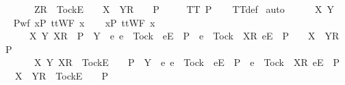 \ \ \ \ \ \ \ \ {\isacharbrackleft}Z{\isacharbrackright}\isactrlsub R\ {\isacharhash}\ {\isacharbrackleft}Tock{\isacharbrackright}\isactrlsub E\ {\isacharhash}\ {\isasymrho}\ {\isacharat}\ {\isacharbrackleft}{\isacharbrackleft}X\ {\isasymunion}\ Y{\isacharbrackright}\isactrlsub R{\isacharbrackright}\ {\isacharat}\ {\isasymsigma}\ {\isasymin}\ P{\isacharparenright}{\isacharparenright}\ {\isasymLongrightarrow}\isanewline
\ \ \ \ TT{}\ P{\isachardoublequoteclose}\isanewline
%
\isadelimproof
\ \ %
\endisadelimproof
%
\isatagproof
{}\isamarkupfalse%
\ TT{}{\isacharunderscore}def\isanewline
{}\isamarkupfalse%
\ auto\isanewline
\ \ \isamarkupfalse%
\ {\isasymrho}\ {\isasymsigma}\ X\ Y\isanewline
\ \ \isamarkupfalse%
\ P{\isacharunderscore}wf{\isacharcolon}\ {\isachardoublequoteopen}{\isasymforall}x{\isasymin}P{\isachardot}\ ttWF\ x{\isachardoublequoteclose}\isanewline
\ \ \isamarkupfalse%
\ {\isachardoublequoteopen}{\isasymforall}x{\isasymin}P{\isachardot}\ ttWF\ x\ {\isasymLongrightarrow}\isanewline
\ \ \ \ \ \ \ {\isacharparenleft}{\isasymAnd}X\ Y{\isachardot}\ {\isacharbrackleft}{\isacharbrackleft}X{\isacharbrackright}\isactrlsub R{\isacharbrackright}\ {\isasymin}\ P\ {\isasymand}\ Y\ {\isasyminter}\ {\isacharbraceleft}e{\isachardot}\ e\ {\isasymnoteq}\ Tock\ {\isasymand}\ {\isacharbrackleft}{\isacharbrackleft}e{\isacharbrackright}\isactrlsub E{\isacharbrackright}\ {\isasymin}\ P\ {\isasymor}\ e\ {\isacharequal}\ Tock\ {\isasymand}\ {\isacharbrackleft}{\isacharbrackleft}X{\isacharbrackright}\isactrlsub R{\isacharcomma}\ {\isacharbrackleft}e{\isacharbrackright}\isactrlsub E{\isacharbrackright}\ {\isasymin}\ P{\isacharbraceright}\ {\isacharequal}\ {\isacharbraceleft}{\isacharbraceright}\ {\isasymLongrightarrow}\ {\isacharbrackleft}{\isacharbrackleft}X\ {\isasymunion}\ Y{\isacharbrackright}\isactrlsub R{\isacharbrackright}\ {\isasymin}\ P{\isacharparenright}\ {\isasymLongrightarrow}\isanewline
\ \ \ \ \ \ \ {\isacharparenleft}{\isasymAnd}{\isasymsigma}\ X\ Y{\isachardot}\ {\isacharbrackleft}X{\isacharbrackright}\isactrlsub R\ {\isacharhash}\ {\isacharbrackleft}Tock{\isacharbrackright}\isactrlsub E\ {\isacharhash}\ {\isasymsigma}\ {\isasymin}\ P\ {\isasymand}\ Y\ {\isasyminter}\ {\isacharbraceleft}e{\isachardot}\ e\ {\isasymnoteq}\ Tock\ {\isasymand}\ {\isacharbrackleft}{\isacharbrackleft}e{\isacharbrackright}\isactrlsub E{\isacharbrackright}\ {\isasymin}\ P\ {\isasymor}\ e\ {\isacharequal}\ Tock\ {\isasymand}\ {\isacharbrackleft}{\isacharbrackleft}X{\isacharbrackright}\isactrlsub R{\isacharcomma}\ {\isacharbrackleft}e{\isacharbrackright}\isactrlsub E{\isacharbrackright}\ {\isasymin}\ P{\isacharbraceright}\ {\isacharequal}\ {\isacharbraceleft}{\isacharbraceright}\ {\isasymLongrightarrow}\ {\isacharbrackleft}X\ {\isasymunion}\ Y{\isacharbrackright}\isactrlsub R\ {\isacharhash}\ {\isacharbrackleft}Tock{\isacharbrackright}\isactrlsub E\ {\isacharhash}\ {\isasymsigma}\ {\isasymin}\ P{\isacharparenright}\ {\isasymLongrightarrow}\isanewline
